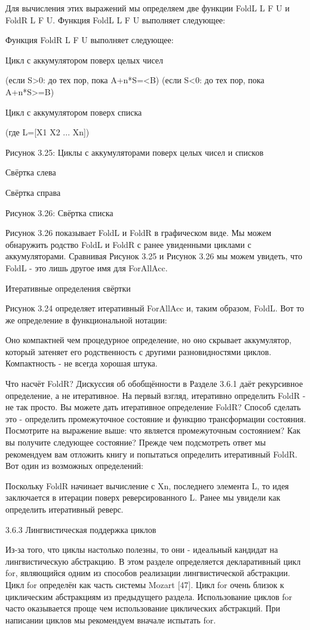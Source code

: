 Для вычисления этих выражений мы определяем две функции {FoldL L F U} и {FoldR L F U}. Функция {FoldL L F U} выполняет следующее:

Функция {FoldR L F U} выполняет следующее:

Цикл с аккумулятором поверх целых чисел

(если S>0: до тех пор, пока A+n*S=<B)
(если S<0: до тех пор, пока A+n*S>=B)

Цикл с аккумулятором поверх списка

(где L=[X1 X2 ... Xn])

Рисунок 3.25: Циклы с аккумуляторами поверх целых чисел и списков

Свёртка слева

Свёртка справа

Рисунок 3.26: Свёртка списка

Рисунок 3.26 показывает FoldL и FoldR в графическом виде. Мы можем обнаружить родство FoldL и FoldR с ранее увиденными циклами с аккумуляторами. Сравнивая Рисунок 3.25 и Рисунок 3.26 мы можем увидеть, что FoldL - это лишь другое имя для ForAllAcc.

Итеративные определения свёртки

Рисунок 3.24 определяет итеративный ForAllAcc и, таким образом, FoldL. Вот то же определение в функциональной нотации:

Оно компактней чем процедурное определение, но оно скрывает аккумулятор, который затеняет его родственность с другими разновидностями циклов. Компактность - не всегда хорошая штука.

Что насчёт FoldR? Дискуссия об обобщённости в Разделе 3.6.1 даёт рекурсивное определение, а не итеративное. На первый взгляд, итеративно определить FoldR - не так просто. Вы можете дать итеративное определение FoldR? Способ сделать это - определить промежуточное состояние и функцию трансформации состояния. Посмотрите на выражение выше: что является промежуточным состоянием? Как вы получите следующее состояние? Прежде чем подсмотреть ответ мы рекомендуем вам отложить книгу и попытаться определить итеративный FoldR. Вот один из возможных определений:

Поскольку FoldR начинает вычисление с Xn, последнего элемента L, то идея заключается в итерации поверх реверсированного L. Ранее мы увидели как определить итеративный реверс.

3.6.3 Лингвистическая поддержка циклов

Из-за того, что циклы настолько полезны, то они - идеальный кандидат на лингвистическую абстракцию. В этом разделе определяется декларативный цикл for, являющийся одним из способов реализации лингвистической абстракции. Цикл for определён как часть системы Mozart [47]. Цикл for очень близок к циклическим абстракциям из предыдущего раздела. Использование циклов for часто оказывается проще чем использование циклических абстракций. При написании циклов мы рекомендуем вначале испытать for.


